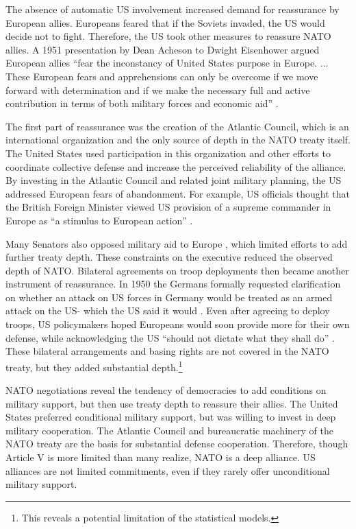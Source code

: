 \documentclass[12pt]{article}
\begin{document}
The absence of automatic US involvement increased demand for reassurance by European allies. 
Europeans feared that if the Soviets invaded, the US would decide not to fight. 
Therefore, the US took other measures to reassure NATO allies. 
A 1951 presentation by Dean Acheson to Dwight Eisenhower argued European allies ``fear the inconstancy of United States purpose in Europe. ... These European fears and apprehensions can only be overcome if we move forward with determination and if we make the necessary full and active contribution in terms of both military forces and economic aid'' \citep[pg. 3]{Acheson1951}. 


The first part of reassurance was the creation of the Atlantic Council, which is an international organization and the only source of depth in the NATO treaty itself. 
The United States used participation in this organization and other efforts to coordinate collective defense and increase the perceived reliability of the alliance. 
By investing in the Atlantic Council and related joint military planning, the US addressed European fears of abandonment. 
For example, US officials thought that the British Foreign Minister viewed US provision of a supreme commander in Europe as ``a stimulus to European action'' \citep{Acheson1950}. 


Many Senators also opposed military aid to Europe \citep[pg 285]{Acheson1969}, which limited efforts to add further treaty depth. 
These constraints on the executive reduced the observed depth of NATO. 
Bilateral agreements on troop deployments then became another instrument of reassurance. 
In 1950 the Germans formally requested clarification on whether an attack on US forces in Germany would be treated as an armed attack on the US- which the US said it would \citep[pg. 395]{Acheson1969}.  
Even after agreeing to deploy troops, US policymakers hoped Europeans would soon provide more for their own defense, while acknowledging the US ``should not dictate what they shall do'' \citep[pg. 2]{Johnson1950}. 
These bilateral arrangements and basing rights are not covered in the NATO treaty, but they added substantial depth.\footnote{This reveals a potential limitation of the statistical models.}  


NATO negotiations reveal the tendency of democracies to add conditions on military support, but then use treaty depth to reassure their allies. 
The United States preferred conditional military support, but was willing to invest in deep military cooperation. 
The Atlantic Council and bureaucratic machinery of the NATO treaty are the basis for substantial defense cooperation. 
Therefore, though Article V is more limited than many realize, NATO is a deep alliance. 
US alliances are not limited commitments, even if they rarely offer unconditional military support. 
\end{document}
